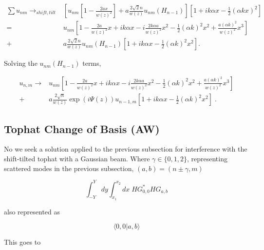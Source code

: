 \documentclass[aps,twoside,secnumarabic,balancelastpage,amsmath,amssymb,nofootinbib,hyperref=pdftex]{revtex4}
\begin{document}
\begin{align*}
	\sum u_{nm} \rightarrow_{shift,tilt}&
    \left[
    u_{nm} 
    [
		1
		-
		\frac{2ax}{w(z)^2}]	
	+ 
	a \frac{2 \sqrt{2} n}{w(z)} 
	u_{nm}(H_{n-1}) \right]
	\left[
        1+ i k \alpha x - \frac{1}{2}(\alpha k x)^2
    \right]
    \\=&
     u_{nm}
        \left[
        1 - \frac{2 a }{w(z)^2} x + i k \alpha x - i \frac{2 k \alpha a}{w(z)^2} x^2 
        -\frac{1}{2}(\alpha k)^2 x^2 + 
        \frac{a(\alpha k)^2}{w(z)^2}x^3
    \right]
    \\+& 
	a \frac{2 \sqrt{2} n}{w(z)} 
	u_{nm}(H_{n-1})
	\left[
        1+ i k \alpha x - \frac{1}{2}(\alpha k)^2 x^2
    \right].
\end{align*}

Solving the $u_{nm}(H_{n-1})$ terms,

\begin{align*}
	u_{n,m} \rightarrow &
	     u_{nm}
        \left[
        1 - \frac{2 a }{w(z)^2} x + i k \alpha x - i \frac{2 k \alpha a}{w(z)^2} x^2 
        -\frac{1}{2}(\alpha k)^2 x^2 + 
        \frac{a(\alpha k)^2}{w(z)^2}x^3
    \right]
    \\+& 
	a \frac{2 \sqrt{n}}{w(z)} 
	\exp(i \Psi(z))
	u_{n-1,m}
	\left[
        1+ i k \alpha x - \frac{1}{2}(\alpha k)^2 x^2
    \right]	 \; .
\end{align*}

\clearpage

\subsection{Tophat Change of Basis (AW) }

No we seek a solution applied to the previous subsection for interference with the shift-tilted tophat with a Gaussian beam. 
Where $\gamma \in \{0,1,2\}$, representing scattered modes in the previous subsection, $(a,b) = (n\pm \gamma,m)$

\begin{equation*}
	\int_{-Y}^{Y}dy \int_{x_1}^{x_2}
	dx \; HG_{0,0}^*HG_{a,b}
\end{equation*}

also represented as

\begin{equation*}
	\langle 0,0 | a,b \rangle
\end{equation*}

This goes to 
\end{document}
